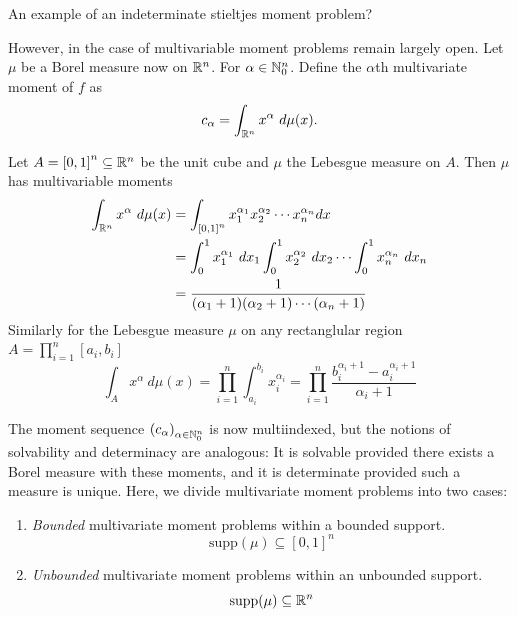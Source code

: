 \begin{myexample}
  An example of an indeterminate stieltjes moment problem?
\end{myexample}

However, in the case of multivariable moment problems remain largely open. Let $\mu$ be a Borel measure now on $\mathbb{R}^n$. For $\alpha \in \mathbb{N}_0^n$. Define the $\alpha$th multivariate moment of $f$ as 
\[
  c_\alpha = \int_{\mathbb{R}^n} x^\alpha ~d\mu(x).
\]

\begin{myexample}
  Let $A = {[0,1]}^n \subseteq \mathbb{R}^n$ be the unit cube and $\mu$ the Lebesgue measure on $A$. Then $\mu$ has multivariable moments
  \begin{align*}
    \int_{\mathbb{R}^n} x^\alpha ~d\mu(x) 
    &= \int_{{[0,1]}^n} x_1^{\alpha_1}x_2^{\alpha_2} \cdots x_n^{\alpha_n} dx \\
    &= \int_0^1 x_1^{\alpha_1} ~dx_1 \int_0^1 x_2^{\alpha_2} ~dx_2 \cdots \int_0^1 x_n^{\alpha_n} ~dx_n \\
    &= \frac{1}{(\alpha_1+1) (\alpha_2+1) \cdots (\alpha_n+1)}
  \end{align*}
  Similarly for the Lebesgue measure $\mu$ on any rectanglular region $A = \prod_{i = 1}^n [a_i, b_i]$
  \[
    \int_A x^\alpha ~d\mu(x) 
    = \prod_{i=1}^n \int_{a_i}^{b_i} x_i^{\alpha_i}
    = \prod_{i = 1}^n \frac{b_i^{\alpha_i + 1} - a_i^{\alpha_i + 1}}{\alpha_i + 1}
  \]
\end{myexample}
The moment sequence ${(c_\alpha)}_{\alpha \in \mathbb{N}_0^n}$ is now multiindexed, but the notions of solvability and determinacy are analogous: It is solvable provided there exists a Borel measure with these moments, and it is determinate provided such a measure is unique. Here, we divide multivariate moment problems into two cases:

\begin{enumerate}[label=]
  \item \emph{Bounded} multivariate moment problems within a bounded support.
  \[
    \text{supp}(\mu) \subseteq {[0,1]}^n
  \]
  \item \emph{Unbounded} multivariate moment problems within an unbounded support.
  \[
    \text{supp}(\mu) \subseteq \mathbb{R}^n
  \]
\end{enumerate}

